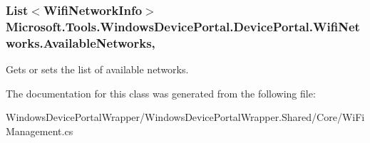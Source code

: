 \subsubsection[{\texorpdfstring{Available\+Networks}{AvailableNetworks}}]{\setlength{\rightskip}{0pt plus 5cm}List$<${\bf Wifi\+Network\+Info}$>$ Microsoft.\+Tools.\+Windows\+Device\+Portal.\+Device\+Portal.\+Wifi\+Networks.\+Available\+Networks\hspace{0.3cm}{\ttfamily [get]}, {\ttfamily [set]}}\hypertarget{class_microsoft_1_1_tools_1_1_windows_device_portal_1_1_device_portal_1_1_wifi_networks_a30d6383d3ffd43b68fb8db308c1c8367}{}\label{class_microsoft_1_1_tools_1_1_windows_device_portal_1_1_device_portal_1_1_wifi_networks_a30d6383d3ffd43b68fb8db308c1c8367}


Gets or sets the list of available networks. 



The documentation for this class was generated from the following file\+:\begin{DoxyCompactItemize}
\item 
Windows\+Device\+Portal\+Wrapper/\+Windows\+Device\+Portal\+Wrapper.\+Shared/\+Core/Wi\+Fi\+Management.\+cs\end{DoxyCompactItemize}
